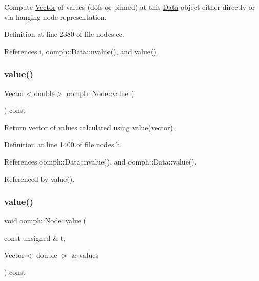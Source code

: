 Compute \hyperlink{classoomph_1_1Vector}{Vector} of values (dofs or pinned) at this \hyperlink{classoomph_1_1Data}{Data} object either directly or via hanging node representation. 

Definition at line 2380 of file nodes.\+cc.



References i, oomph\+::\+Data\+::nvalue(), and value().

\mbox{\label{classoomph_1_1Node_a9be0d0a7d1b73eb4f8d3a7071b862547}} 
\subsubsection{\texorpdfstring{value()}{value()}\hspace{0.1cm}{\footnotesize\ttfamily [4/5]}}
{\footnotesize\ttfamily \hyperlink{classoomph_1_1Vector}{Vector}$<$double$>$ oomph\+::\+Node\+::value (\begin{DoxyParamCaption}{ }\end{DoxyParamCaption}) const\hspace{0.3cm}{\ttfamily [inline]}}



Return vector of values calculated using value(vector). 



Definition at line 1400 of file nodes.\+h.



References oomph\+::\+Data\+::nvalue(), and oomph\+::\+Data\+::value().



Referenced by value().

\mbox{\label{classoomph_1_1Node_a8537fa95092b7d136a5a81a7b6f72bfc}} 
\subsubsection{\texorpdfstring{value()}{value()}\hspace{0.1cm}{\footnotesize\ttfamily [5/5]}}
{\footnotesize\ttfamily void oomph\+::\+Node\+::value (\begin{DoxyParamCaption}\item[{const unsigned \&}]{t,  }\item[{\hyperlink{classoomph_1_1Vector}{Vector}$<$ double $>$ \&}]{values }\end{DoxyParamCaption}) const}



